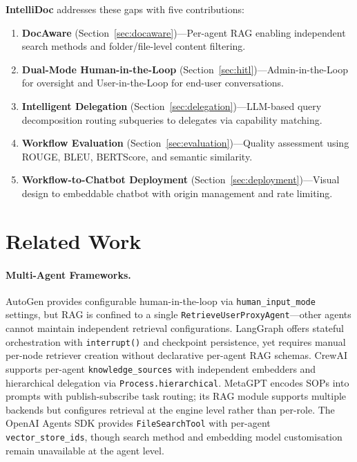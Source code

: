 \documentclass[11pt]{article}
\begin{document}
\textbf{IntelliDoc} addresses these gaps with five contributions:

\begin{enumerate}
    \item \textbf{DocAware} (Section~\ref{sec:docaware})—Per-agent RAG enabling independent search methods and folder/file-level content filtering.
    
    \item \textbf{Dual-Mode Human-in-the-Loop} (Section~\ref{sec:hitl})—Admin-in-the-Loop for oversight and User-in-the-Loop for end-user conversations.
    
    \item \textbf{Intelligent Delegation} (Section~\ref{sec:delegation})—LLM-based query decomposition routing subqueries to delegates via capability matching.
    
    \item \textbf{Workflow Evaluation} (Section~\ref{sec:evaluation})—Quality assessment using ROUGE, BLEU, BERTScore, and semantic similarity.
    
    \item \textbf{Workflow-to-Chatbot Deployment} (Section~\ref{sec:deployment})—Visual design to embeddable chatbot with origin management and rate limiting.
\end{enumerate}

\section{Related Work}
\label{sec:related}

\paragraph{Multi-Agent Frameworks.}
AutoGen \citep{wu2024autogen} provides configurable human-in-the-loop via \texttt{human\_input\_mode} settings, but RAG is confined to a single \texttt{RetrieveUserProxyAgent}---other agents cannot maintain independent retrieval configurations. LangGraph \citep{langgraph2024} offers stateful orchestration with \texttt{interrupt()} and checkpoint persistence, yet requires manual per-node retriever creation without declarative per-agent RAG schemas. CrewAI \citep{crewai2024} supports per-agent \texttt{knowledge\_sources} with independent embedders and hierarchical delegation via \texttt{Process.hierarchical}. MetaGPT \citep{hong2024metagpt} encodes SOPs into prompts with publish-subscribe task routing; its RAG module supports multiple backends but configures retrieval at the engine level rather than per-role. The OpenAI Agents SDK \citep{openaiagents2024} provides \texttt{FileSearchTool} with per-agent \texttt{vector\_store\_ids}, though search method and embedding model customisation remain unavailable at the agent level.
\end{document}
